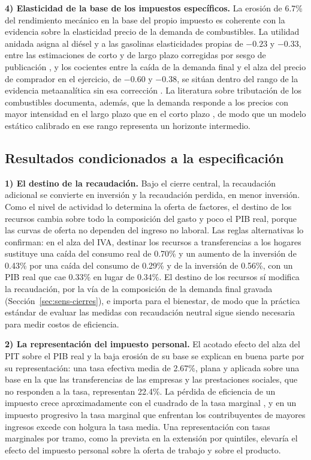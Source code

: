 \documentclass[11pt]{article}
\begin{document}
\textbf{4) Elasticidad de la base de los impuestos específicos.} La erosión de 6.7\% del rendimiento mecánico en la base del propio impuesto es coherente con la evidencia sobre la elasticidad precio de la demanda de combustibles. La utilidad anidada asigna al diésel y a las gasolinas elasticidades propias de $-0.23$ y $-0.33$, entre las estimaciones de corto y de largo plazo corregidas por sesgo de publicación \cite{havranek_etal_2012}, y los cocientes entre la caída de la demanda final y el alza del precio de comprador en el ejercicio, de $-0.60$ y $-0.38$, se sitúan dentro del rango de la evidencia metaanalítica sin esa corrección \cite{brons_etal_2008}. La literatura sobre tributación de los combustibles documenta, además, que la demanda responde a los precios con mayor intensidad en el largo plazo que en el corto plazo \cite{brons_etal_2008,havranek_etal_2012}, de modo que un modelo estático calibrado en ese rango representa un horizonte intermedio.

\subsection{Resultados condicionados a la especificación}

\textbf{1) El destino de la recaudación.} Bajo el cierre central, la recaudación adicional se convierte en inversión y la recaudación perdida, en menor inversión. Como el nivel de actividad lo determina la oferta de factores, el destino de los recursos cambia sobre todo la composición del gasto y poco el PIB real, porque las curvas de oferta no dependen del ingreso no laboral. Las reglas alternativas lo confirman: en el alza del IVA, destinar los recursos a transferencias a los hogares sustituye una caída del consumo real de 0.70\% y un aumento de la inversión de 0.43\% por una caída del consumo de 0.29\% y de la inversión de 0.56\%, con un PIB real que cae 0.33\% en lugar de 0.34\%. El destino de los recursos sí modifica la recaudación, por la vía de la composición de la demanda final gravada (Sección~\ref{sec:sens-cierres}), e importa para el bienestar, de modo que la práctica estándar de evaluar las medidas con recaudación neutral \cite{shoven_whalley_1984,ballard_fullerton_shoven_whalley_1985} sigue siendo necesaria para medir costos de eficiencia.

\textbf{2) La representación del impuesto personal.} El acotado efecto del alza del PIT sobre el PIB real y la baja erosión de su base se explican en buena parte por su representación: una tasa efectiva media de 2.67\%, plana y aplicada sobre una base en la que las transferencias de las empresas y las prestaciones sociales, que no responden a la tasa, representan 22.4\%. La pérdida de eficiencia de un impuesto crece aproximadamente con el cuadrado de la tasa marginal \cite{auerbach_hines_2002}, y en un impuesto progresivo la tasa marginal que enfrentan los contribuyentes de mayores ingresos excede con holgura la tasa media. Una representación con tasas marginales por tramo, como la prevista en la extensión por quintiles, elevaría el efecto del impuesto personal sobre la oferta de trabajo y sobre el producto.
\end{document}
